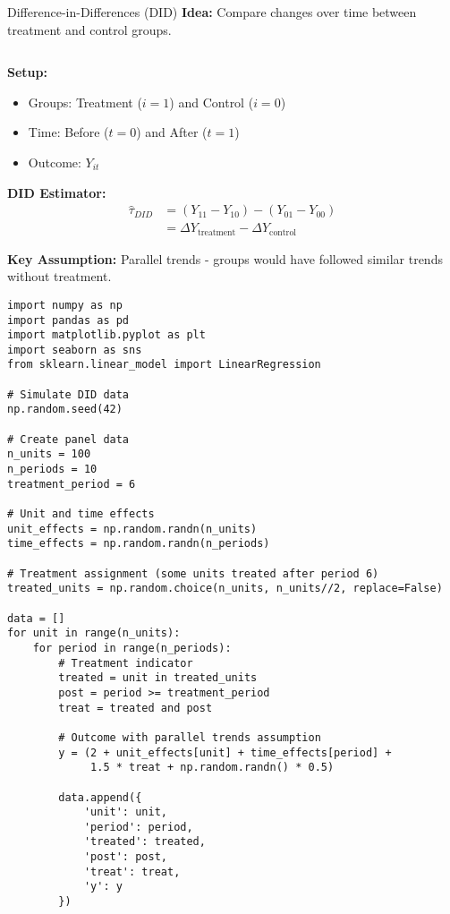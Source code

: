 \documentclass[aspectratio=169,11pt]{beamer}
\begin{document}
\begin{frame}[fragile]{Difference-in-Differences (DID)}
\textbf{Idea:} Compare changes over time between treatment and control groups.

\begin{columns}
\begin{column}{0.55\textwidth}
\textbf{Setup:}
\begin{itemize}
\item Groups: Treatment ($i=1$) and Control ($i=0$)
\item Time: Before ($t=0$) and After ($t=1$)
\item Outcome: $Y_{it}$
\end{itemize}

\textbf{DID Estimator:}
\begin{align}
\hat{\tau}_{DID} &= (Y_{11} - Y_{10}) - (Y_{01} - Y_{00})\\
&= \Delta Y_{\text{treatment}} - \Delta Y_{\text{control}}
\end{align}

\textbf{Key Assumption:} Parallel trends - groups would have followed similar trends without treatment.

\begin{lstlisting}[basicstyle=\ttfamily\tiny]
import numpy as np
import pandas as pd
import matplotlib.pyplot as plt
import seaborn as sns
from sklearn.linear_model import LinearRegression

# Simulate DID data
np.random.seed(42)

# Create panel data
n_units = 100
n_periods = 10
treatment_period = 6

# Unit and time effects
unit_effects = np.random.randn(n_units)
time_effects = np.random.randn(n_periods)

# Treatment assignment (some units treated after period 6)
treated_units = np.random.choice(n_units, n_units//2, replace=False)

data = []
for unit in range(n_units):
    for period in range(n_periods):
        # Treatment indicator
        treated = unit in treated_units
        post = period >= treatment_period
        treat = treated and post
        
        # Outcome with parallel trends assumption
        y = (2 + unit_effects[unit] + time_effects[period] + 
             1.5 * treat + np.random.randn() * 0.5)
        
        data.append({
            'unit': unit,
            'period': period,
            'treated': treated,
            'post': post,
            'treat': treat,
            'y': y
        })


\end{lstlisting}
\end{column}
\end{columns}
\end{frame}
\end{document}
